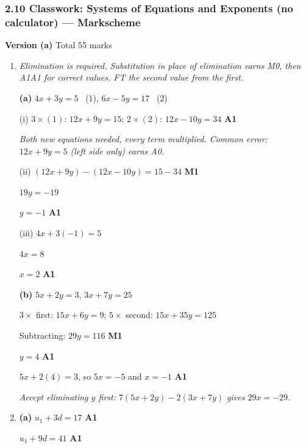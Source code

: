 \documentclass[12pt, twoside]{article}
\begin{document}
\subsubsection*{2.10 Classwork: Systems of Equations and Exponents (no calculator) --- Markscheme}

\textbf{\large Version (a)} \hfill Total 55 marks

\begin{enumerate}[itemsep=0.3cm]

\item[1.] [Maximum mark: 7]

\emph{Elimination is required. Substitution in place of elimination earns
M0, then A1A1 for correct values. FT the second value from the first.}

\textbf{(a)} $4x + 3y = 5$ \ (1), \quad $6x - 5y = 17$ \ (2)

(i) $3 \times (1)$: $12x + 9y = 15$; \quad $2 \times (2)$: $12x - 10y = 34$
\hfill \textbf{A1}

\emph{Both new equations needed, every term multiplied. Common error:
$12x + 9y = 5$ (left side only) earns A0.}

(ii) $(12x + 9y) - (12x - 10y) = 15 - 34$ \hfill \textbf{M1}

$19y = -19$

$y = -1$ \hfill \textbf{A1}

(iii) $4x + 3(-1) = 5$

$4x = 8$

$x = 2$ \hfill \textbf{A1}

\textbf{(b)} $5x + 2y = 3$, \quad $3x + 7y = 25$

$3 \times$ first: $15x + 6y = 9$; \quad $5 \times$ second: $15x + 35y = 125$

Subtracting: $29y = 116$ \hfill \textbf{M1}

$y = 4$ \hfill \textbf{A1}

$5x + 2(4) = 3$, so $5x = -5$ and $x = -1$ \hfill \textbf{A1}

\emph{Accept eliminating $y$ first: $7(5x + 2y) - 2(3x + 7y)$ gives
$29x = -29$.}

\newpage

\item[2.] [Maximum mark: 13]

\textbf{(a)} $u_{1} + 3d = 17$ \hfill \textbf{A1}

$u_{1} + 9d = 41$ \hfill \textbf{A1}


\end{enumerate}
\end{document}
